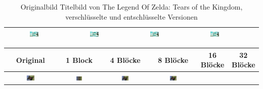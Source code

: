 \begin{landscape}
\begin{table}[h!]
\begin{tabular}{|c|c|c|c|c|c|}
    \includegraphics[width=0.16\textwidth]{./img/decipher/04_tloztotk.png}& 
    \includegraphics[width=0.16\textwidth]{./img/decipher/08_tloztotk.png}& 
    \includegraphics[width=0.16\textwidth]{./img/decipher/16_tloztotk.png}& 
    \includegraphics[width=0.16\textwidth]{./img/decipher/32_tloztotk.png}\\
    \hline
    \end{tabular}
    \caption{Originalbild Titelbild von The Legend Of Zelda: Tears of the Kingdom, verschlüsselte und entschlüsselte Versionen}
\end{table}
\begin{table}[h!]
    \begin{tabular}{|c|c|c|c|c|c|}
    \hline
    \textbf{Original} & \textbf{1 Block} & \textbf{4 Blöcke} & \textbf{8 Blöcke} & \textbf{16 Blöcke} & \textbf{32 Blöcke} \\
    \hline
    \includegraphics[width=0.16\textwidth]{./img/tloztp.png}& 
    \includegraphics[width=0.16\textwidth]{./img/cipher/01_tloztp.png}& 
    \includegraphics[width=0.16\textwidth]{./img/cipher/04_tloztp.png}& 
    \includegraphics[width=0.16\textwidth]{./img/cipher/08_tloztp.png}& 

\end{tabular}
\end{table}
\end{landscape}
